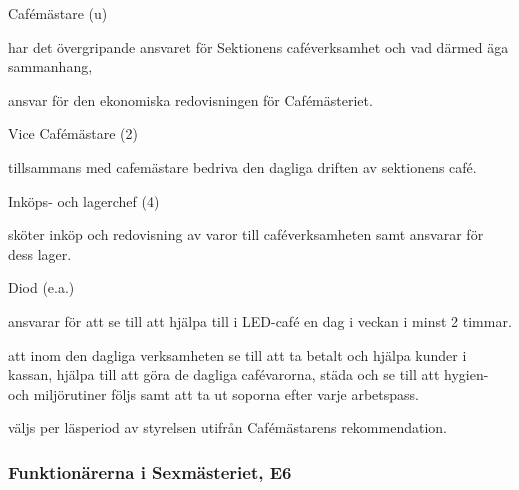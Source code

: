 \documentclass[10pt]{article}
\begin{document}
\begin{emptylist}
    \item Cafémästare (u)
        \begin{dashlist}
            \item har det övergripande ansvaret för Sektionens
                caféverksamhet och vad därmed äga sammanhang,
            \item ansvar för den ekonomiska redovisningen för
                Cafémästeriet.
        \end{dashlist}
    \item Vice Cafémästare (2)
        \begin{dashlist}
            \item tillsammans med cafemästare bedriva den dagliga driften
                av sektionens café.
        \end{dashlist}
    \item Inköps- och lagerchef (4)
        \begin{dashlist}
            \item sköter inköp och redovisning av varor till
                caféverksamheten samt ansvarar för dess lager.
        \end{dashlist}
    \item Diod (e.a.)
    		\begin{dashlist}
            \item ansvarar för att se till att hjälpa till i LED-café en dag i veckan i minst 2 timmar.
            \item att inom den dagliga verksamheten se till att ta betalt och hjälpa kunder i kassan, hjälpa till att göra de dagliga cafévarorna, städa och se till att hygien- och miljörutiner följs samt att ta ut soporna efter varje arbetspass.
            \item väljs per läsperiod av styrelsen utifrån Cafémästarens rekommendation.
        \end{dashlist}
\end{emptylist}
\subsubsection{Funktionärerna i Sexmästeriet, E6}
\end{document}
